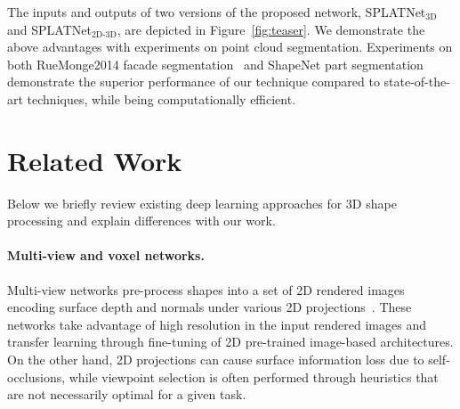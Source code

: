 \documentclass[10pt,twocolumn,letterpaper]{article}
\begin{document}
The inputs and outputs of two versions of the proposed network, SPLATNet$_{\text{3D}}$ and SPLATNet$_{\text{2D-3D}}$, 
are depicted in Figure~\ref{fig:teaser}.
We demonstrate the above advantages with experiments on point cloud segmentation. 
Experiments on both RueMonge2014 facade segmentation~\cite{riemenschneider2014learning} and ShapeNet part segmentation~\cite{yi2016scalable} 
demonstrate the superior performance of our technique compared to state-of-the-art techniques, 
while being computationally efficient.

\section{Related Work}\label{sec:related}

Below we briefly review existing deep learning approaches for 3D shape processing and explain differences with our work.

\vspace{-0.35cm}\paragraph{Multi-view and voxel networks.} Multi-view networks pre-process shapes into a set of 2D rendered images encoding surface depth and normals under various 2D projections~\cite{su15mvcnn,qi2016volmv,bai2016gift,kalogerakis2017shapepfcn,cao2017sphericalprojection,huang2018lmvcnn}. These networks take advantage of high resolution in the input rendered images and transfer learning through fine-tuning of 2D pre-trained image-based architectures. On the other hand, 2D projections can cause surface information loss due to self-occlusions, while viewpoint selection is often performed through heuristics that are not necessarily optimal for a given task.
\end{document}
